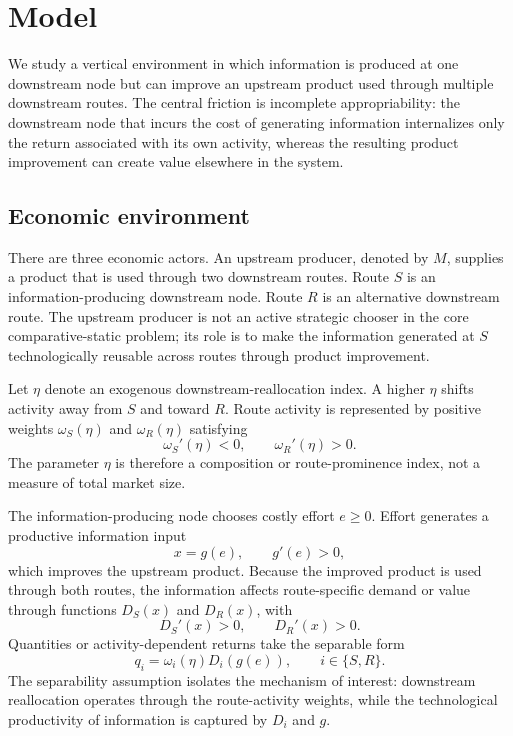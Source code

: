 \section{Model}\label{sec:model}

We study a vertical environment in which information is produced at one downstream node but can improve an upstream product used through multiple downstream routes. The central friction is incomplete appropriability: the downstream node that incurs the cost of generating information internalizes only the return associated with its own activity, whereas the resulting product improvement can create value elsewhere in the system.

\subsection{Economic environment}

There are three economic actors. An upstream producer, denoted by $M$, supplies a product that is used through two downstream routes. Route $S$ is an information-producing downstream node. Route $R$ is an alternative downstream route. The upstream producer is not an active strategic chooser in the core comparative-static problem; its role is to make the information generated at $S$ technologically reusable across routes through product improvement.

Let $\eta$ denote an exogenous downstream-reallocation index. A higher $\eta$ shifts activity away from $S$ and toward $R$. Route activity is represented by positive weights $\omega_S(\eta)$ and $\omega_R(\eta)$ satisfying
\begin{equation}
    \omega_S'(\eta)<0, \qquad \omega_R'(\eta)>0.
    \label{eq:routeweights}
\end{equation}
The parameter $\eta$ is therefore a composition or route-prominence index, not a measure of total market size.

The information-producing node chooses costly effort $e\geq 0$. Effort generates a productive information input
\begin{equation}
    x=g(e), \qquad g'(e)>0,
    \label{eq:learning}
\end{equation}
which improves the upstream product. Because the improved product is used through both routes, the information affects route-specific demand or value through functions $D_S(x)$ and $D_R(x)$, with
\begin{equation}
    D_S'(x)>0, \qquad D_R'(x)>0.
    \label{eq:reuse}
\end{equation}
Quantities or activity-dependent returns take the separable form
\begin{equation}
    q_i=\omega_i(\eta)D_i(g(e)), \qquad i\in\{S,R\}.
    \label{eq:quantities}
\end{equation}
The separability assumption isolates the mechanism of interest: downstream reallocation operates through the route-activity weights, while the technological productivity of information is captured by $D_i$ and $g$.


